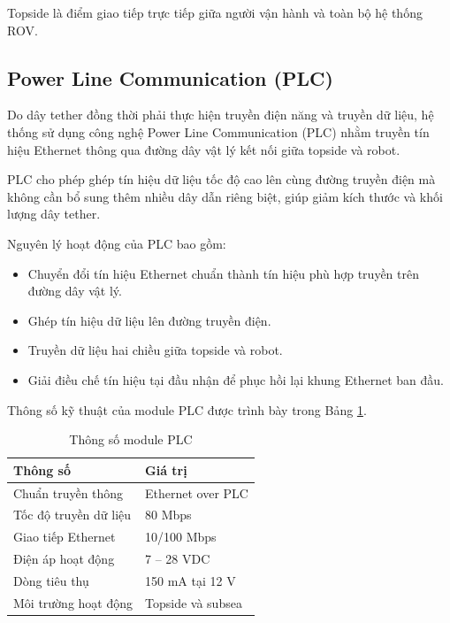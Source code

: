 \documentclass[../DoAn.tex]{subfiles}
\begin{document}
Topside là điểm giao tiếp trực tiếp giữa người vận hành và toàn bộ hệ thống ROV.

\subsection{Power Line Communication (PLC)}

Do dây tether đồng thời phải thực hiện truyền điện năng và truyền dữ liệu, hệ thống sử dụng công nghệ Power Line Communication (PLC) nhằm truyền tín hiệu Ethernet thông qua đường dây vật lý kết nối giữa topside và robot.

PLC cho phép ghép tín hiệu dữ liệu tốc độ cao lên cùng đường truyền điện mà không cần bổ sung thêm nhiều dây dẫn riêng biệt, giúp giảm kích thước và khối lượng dây tether.

Nguyên lý hoạt động của PLC bao gồm:

\begin{itemize}
    \item Chuyển đổi tín hiệu Ethernet chuẩn thành tín hiệu phù hợp truyền trên đường dây vật lý.
    \item Ghép tín hiệu dữ liệu lên đường truyền điện.
    \item Truyền dữ liệu hai chiều giữa topside và robot.
    \item Giải điều chế tín hiệu tại đầu nhận để phục hồi lại khung Ethernet ban đầu.
\end{itemize}

Thông số kỹ thuật của module PLC được trình bày trong Bảng \ref{tab:plc_specification}.

\begin{table}[H]
\centering
\caption{Thông số module PLC}
\label{tab:plc_specification}
\begin{tabular}{|p{6cm}|p{6cm}|}
\hline
\textbf{Thông số} & \textbf{Giá trị} \\ \hline

Chuẩn truyền thông & Ethernet over PLC \\ \hline

Tốc độ truyền dữ liệu & 80 Mbps \\ \hline

Giao tiếp Ethernet & 10/100 Mbps \\ \hline

Điện áp hoạt động & 7 -- 28 VDC \\ \hline

Dòng tiêu thụ & 150 mA tại 12 V \\ \hline

Môi trường hoạt động & Topside và subsea \\ \hline

\end{tabular}
\end{table}
\end{document}
